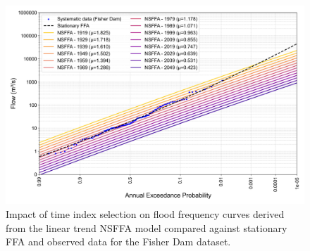 \begin{figure}[ht!]
    \centering
    \includegraphics[width=1\linewidth]{_plots/OCD_bayesian_flood_quantiles_lp3_linear_mu_TI.png}
    \caption{Impact of time index selection on flood frequency curves derived from the linear trend NSFFA model compared against stationary FFA and observed data for the Fisher Dam dataset.}
    \label{fig:OCD_bayesian_flood_quantiles_lp3_linear_mu_TI}
\end{figure}

